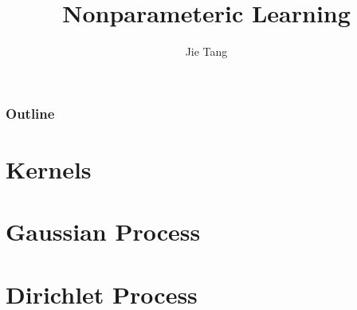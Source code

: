 \documentclass{beamer}
\title{Nonparameteric Learning}
\author{Jie Tang}
\begin{document}
\begin{frame}
\titlepage
\end{frame}

\begin{frame}
\frametitle{Outline}
\tableofcontents[pausesections]
\end{frame}

\section{Kernels}
\section{Gaussian Process}



\section{Dirichlet Process}
\end{document}
